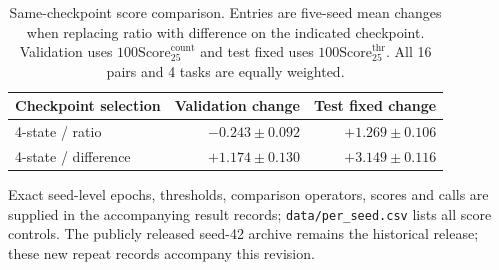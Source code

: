 \begin{table}[H]\centering
\caption{Same-checkpoint score comparison. Entries are five-seed mean changes when replacing ratio with difference on the indicated checkpoint. Validation uses $100\mathrm{Score}_{25}^{\mathrm{count}}$ and test fixed uses $100\mathrm{Score}_{25}^{\mathrm{thr}}$. All 16 pairs and 4 tasks are equally weighted.}
\begin{tabular}{lrr}\toprule Checkpoint selection & Validation change & Test fixed change \\\midrule
4-state / ratio & $-0.243\pm0.092$ & $+1.269\pm0.106$ \\
4-state / difference & $+1.174\pm0.130$ & $+3.149\pm0.116$ \\
\bottomrule\end{tabular}\end{table}
Exact seed-level epochs, thresholds, comparison operators, scores and calls are supplied in the accompanying result records; \texttt{data/per\_seed.csv} lists all score controls. The publicly released seed-42 archive remains the historical release; these new repeat records accompany this revision.
